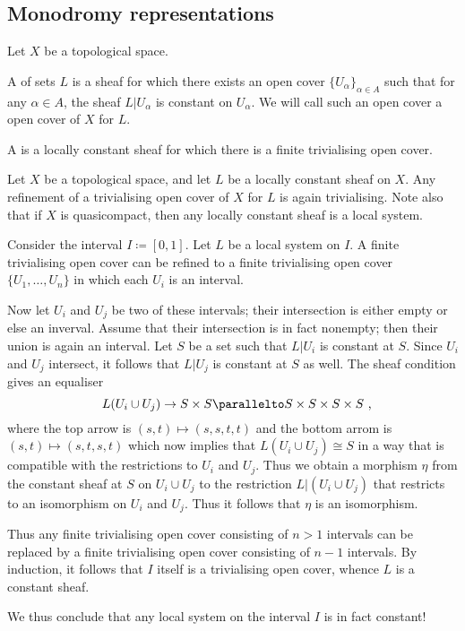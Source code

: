 \subsection*{Monodromy representations}
\begin{dfn}
	Let $ X $ be a topological space.

	A   of sets $ L $ is a sheaf for which there exists an open cover $ \{ U_{\alpha} \}_{\alpha \in A} $ such that for any $ \alpha \in A $, the sheaf $ L | U_{\alpha} $ is constant on $ U_{\alpha} $.
	We will call such an open cover a  open cover of $ X $ for $ L $.

	A  is a locally constant sheaf for which there is a finite trivialising open cover.
\end{dfn}

\begin{nul}
	Let $ X $ be a topological space, and let $ L $ be a locally constant sheaf on $ X $. 
	Any refinement of a trivialising open cover of $ X $ for $ L $ is again trivialising.
	Note also that if $ X $ is quasicompact, then any locally constant sheaf is a local system.
\end{nul}

\begin{exm}
	Consider the interval $ I \coloneq [0, 1] $.
	Let $ L $ be a local system on $ I $.
	A finite trivialising open cover can be refined to a finite trivialising open cover $ \{ U_1, \dots, U_n \} $ in which each $ U_{i} $ is an interval.

	Now let $ U_{i} $ and $ U_{j} $ be two of these intervals;
	their intersection is either empty or else an inverval.
	Assume that their intersection is in fact nonempty;
	then their union is again an interval.
	Let $ S $ be a set such that $ L | U_{i} $ is constant at $ S $.
	Since $ U_{i} $ and $ U_{j} $ intersect, it follows that $ L | U_{j} $ is constant at $ S $ as well.
	The sheaf condition gives an equaliser
	\[
		L(U_{i} \cup U_{j}) \to S \times S \parallelto S \times S \times S \times S \comma
	\]
	where the top arrow is $ (s, t) \mapsto (s, s, t, t) $ and the bottom arrom is $ (s, t) \mapsto (s, t, s, t) $ which now implies that $ L(U_{i} \cup U_{j}) \cong S $ in a way that is compatible with the restrictions to $ U_{i} $ and $ U_{j} $.
	Thus we obtain a morphism $ \eta $ from the constant sheaf at $ S $ on $ U_{i} \cup U_{j} $ to the restriction $ L | (U_{i} \cup U_{j}) $
	that restricts to an isomorphism on $ U_{i} $ and $ U_{j} $.
	Thus it follows that $ \eta $ is an isomorphism.

	Thus any finite trivialising open cover consisting of $ n > 1$ intervals can be replaced by a finite trivialising open cover consisting of $ n - 1 $ intervals.
	By induction, it follows that $ I $ itself is a trivialising open cover, whence $ L $ is a constant sheaf.

	We thus conclude that any local system on the interval $ I $ is in fact constant!
\end{exm}

